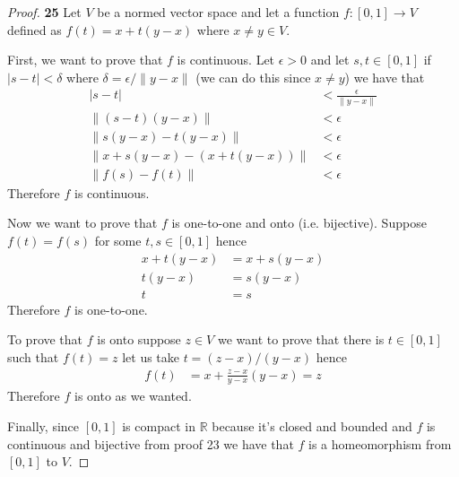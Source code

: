 \documentclass[11pt]{article}
\newcommand{\R}{\mathbb{R}}
\theoremstyle{definition}
\begin{document}
    \begin{proof}{\textbf{25}}
        Let $V$ be a normed vector space and let a function $f:[0,1] \to V$
        defined as $f(t) = x + t(y-x)$ where $x \neq y \in V$.

        First, we want to prove that $f$ is continuous.
        Let $\epsilon > 0$ and let
        $s,t \in [0,1]$ if $|s-t|< \delta$ where $\delta = \epsilon/\|y-x\|$
        (we can do this since $x\neq y$) we have that
        \begin{align*}
            |s-t| &< \frac{\epsilon}{\|y-x\|}\\
            \|(s-t)(y-x)\| &< \epsilon\\
            \|s(y-x)-t(y-x)\| &< \epsilon\\
            \|x + s(y-x)-(x + t(y-x))\| &< \epsilon\\
            \|f(s)-f(t)\| &< \epsilon
        \end{align*}
        Therefore $f$ is continuous.

        Now we want to prove that $f$ is one-to-one and onto (i.e. bijective).
        Suppose $f(t) = f(s)$ for some $t,s \in [0,1]$ hence
        \begin{align*}
            x + t(y-x) &= x + s(y-x)\\
            t(y-x) &= s(y-x)\\
            t &= s
        \end{align*}
        Therefore $f$ is one-to-one.

        To prove that $f$ is onto suppose $z \in V$ we want to prove that
        there is $t \in [0,1]$ such that $f(t) = z$ let us take
        $t = (z - x)/(y-x)$ hence
        \begin{align*}
            f(t) &= x + \frac{z-x}{y-x}(y-x) = z
        \end{align*}
        Therefore $f$ is onto as we wanted.
        
        Finally, since $[0,1]$ is compact in $\R$ because it's closed and bounded
        and $f$ is continuous and bijective from proof 23 we have that $f$ is
        a homeomorphism from $[0,1]$ to $V$.
    \end{proof}
    \cleardoublepage
\end{document}
